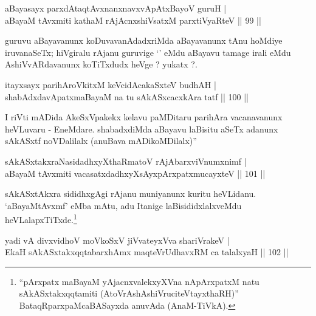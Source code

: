 
\begin{shl}
aBayasayx parxdAtaqtAvxnanxnavxvApAtxBayoV guruH |\\
aBayaM tAvxmiti kathaM rAjAcnx\s \s shiVsatxM parxtiVyaRteV \hfill || 99 || 
\end{shl}

\begin{artha}
guruvu aBayavanunx koDuvavanAdadxriMda aBayavanunx tAnu hoMdiye iruvanaSeTx; hiVgiralu rAjanu guruvige `\stext' eMdu aBayavu tamage irali eMdu AshiVvARdavanunx koTiTxdudx heVge ? yukatx ?.
\end{artha}


\begin{shl}
itayxsayx parihAroVkitxM keVcidAcakaSxteV budhAH |\\
shabAdxdavApatxmaBayaM na tu sAkASxcacxkAra tatf \hfill || 100 || 
\end{shl}

\begin{artha}
I riVti mADida AkeSxVpakekx kelavu paMDitaru parihAra vacanavanunx heVLuvaru - EneMdare. shabadxdiMda aBayavu laBisitu aSeTx adanunx sAkASxtf noVDalilalx (anuBava mADikoMDilalx)''
\end{artha}

\begin{shl}
sAkASxtakxraNasidadhxyXthaRmatoV rAjA\s barxviVnumxnimf |\\
aBayaM tAvxmiti vacasatxdadhxyXsAyxpArxpatxmucayxteV \hfill || 101 || 
\end{shl}

\begin{artha}
sAkASxtAkxra sididhxgAgi rAjanu muniyanunx kuritu heVLidanu. `aBayaMtAvxmf' eMba mAtu, adu Itanige laBisididxlalxveMdu heVLalapxTiTxde.\footnote{``pArxpatx maBayaM yAjacnxvalekxyXVna nApArxpatxM natu sAkASxtakxqqtamiti (AtoVrAshAshiVruciteVtayxthaRH)'' BataqRparxpaMcaBASayxda anuvAda (AnaM-TiVkA).}
\end{artha}


\begin{shl}
yadi vA divxvidhoV moVkoSxV jiVvateyxVva shariVrakeV |\\
EkaH sAkASxtakxqqtabarxhAmx maqteVrUdhavxRM ca talalxyaH \hfill || 102 || 
\end{shl}

